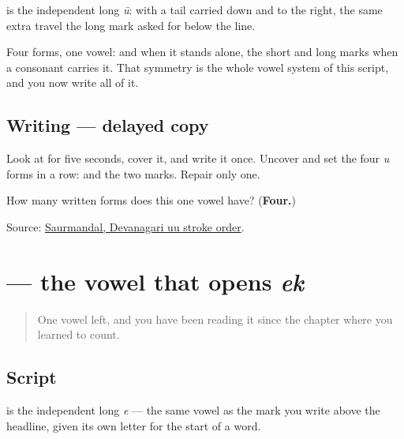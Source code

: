 \textbf{} is the independent long \emph{ū}: \textbf{} with a tail carried down and to the right, the same extra travel the long mark asked for below the line.

Four forms, one vowel: \textbf{} and \textbf{} when it stands alone, the short and long marks when a consonant carries it. That symmetry is the whole vowel system of this script, and you now write all of it.

\subsection*{Writing — delayed copy}

Look at \textbf{} for five seconds, cover it, and write it once. Uncover and set the four \emph{u} forms in a row: \textbf{ } and the two marks. Repair only one.

\begin{tcolorbox}[breakable,colback=teal!4,colframe=teal!35!black,title={Before you move on}]
How many written forms does this one vowel have? (\textbf{Four.})

Source: \href{https://commons.wikimedia.org/wiki/File:Devanagari\_\%E0\%A4\%8A\_stroke\_order.svg}{Saurmandal, Devanagari uu stroke order}.
\end{tcolorbox}
\section[\texorpdfstring{\mr{ए} (e)}{ए (e)}]{ — the vowel that opens \emph{ek}}

\label{lesson:MR-W08-e-independent}



\begin{quote}
One vowel left, and you have been reading it since the chapter where you learned to count.
\end{quote}

\subsection*{Script}
\begin{quote}
\end{quote}

\textbf{} is the independent long \emph{e} — the same vowel as the \textbf{} mark you write above the headline, given its own letter for the start of a word.

